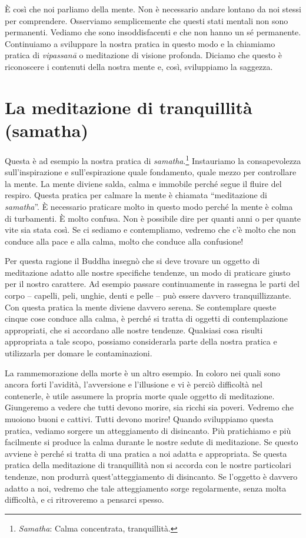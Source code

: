 È così che noi parliamo della mente. Non è necessario andare lontano da
noi stessi per comprendere. Osserviamo semplicemente che questi stati
mentali non sono permanenti. Vediamo che sono insoddisfacenti e che non
hanno un sé permanente. Continuiamo a sviluppare la nostra pratica in
questo modo e la chiamiamo pratica di \emph{vipassanā} o meditazione di
visione profonda. Diciamo che questo è riconoscere i contenuti della
nostra mente e, così, sviluppiamo la saggezza.

\section{La meditazione di tranquillità (samatha)}

Questa è ad esempio la nostra pratica di
\emph{samatha}.\footnote{\emph{Samatha}: Calma
  concentrata, tranquillità.} Instauriamo la consapevolezza
sull'inspirazione e sull'espirazione quale fondamento, quale mezzo per
controllare la mente. La mente diviene salda, calma e immobile perché
segue il fluire del respiro. Questa pratica per calmare la mente è
chiamata ``meditazione di \emph{samatha}''. È necessario praticare molto
in questo modo perché la mente è colma di turbamenti. È molto confusa.
Non è possibile dire per quanti anni o per quante vite sia stata così.
Se ci sediamo e contempliamo, vedremo che c'è molto che non conduce alla
pace e alla calma, molto che conduce alla confusione!

Per questa ragione il Buddha insegnò che si deve trovare un oggetto di
meditazione adatto alle nostre specifiche tendenze, un modo di praticare
giusto per il nostro carattere. Ad esempio passare continuamente in
rassegna le parti del corpo -- capelli, peli, unghie, denti e pelle --
può essere davvero tranquillizzante. Con questa pratica la mente diviene
davvero serena. Se contemplare queste cinque cose conduce alla calma, è
perché si tratta di oggetti di contemplazione appropriati, che si
accordano alle nostre tendenze. Qualsiasi cosa risulti appropriata a
tale scopo, possiamo considerarla parte della nostra pratica e
utilizzarla per domare le contaminazioni.

La rammemorazione della morte è un altro esempio. In coloro nei quali
sono ancora forti l'avidità, l'avversione e l'illusione e vi è perciò
difficoltà nel contenerle, è utile assumere la propria morte quale
oggetto di meditazione. Giungeremo a vedere che tutti devono morire, sia
ricchi sia poveri. Vedremo che muoiono buoni e cattivi. Tutti devono
morire! Quando sviluppiamo questa pratica, vediamo sorgere un
atteggiamento di disincanto. Più pratichiamo e più facilmente si produce
la calma durante le nostre sedute di meditazione. Se questo avviene è
perché si tratta di una pratica a noi adatta e appropriata. Se questa
pratica della meditazione di tranquillità non si accorda con le nostre
particolari tendenze, non produrrà quest'atteggiamento di disincanto.
Se l'oggetto è davvero adatto a noi, vedremo che tale atteggiamento
sorge regolarmente, senza molta difficoltà, e ci ritroveremo a pensarci
spesso.


